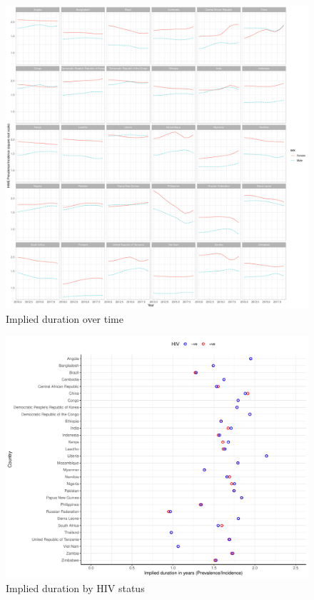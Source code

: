 \documentclass[12pt]{article}
\begin{document}
\FloatBarrier

\begin{figure}
\centering
\includegraphics[width=1\textwidth]{../plots/aF6.pdf}
\caption{Implied duration over time}
\end{figure}

\FloatBarrier


\begin{figure}
\centering
\includegraphics[width=1\textwidth]{../plots/aF7.pdf}
\caption{Implied duration by HIV status}
\end{figure}
\end{document}
